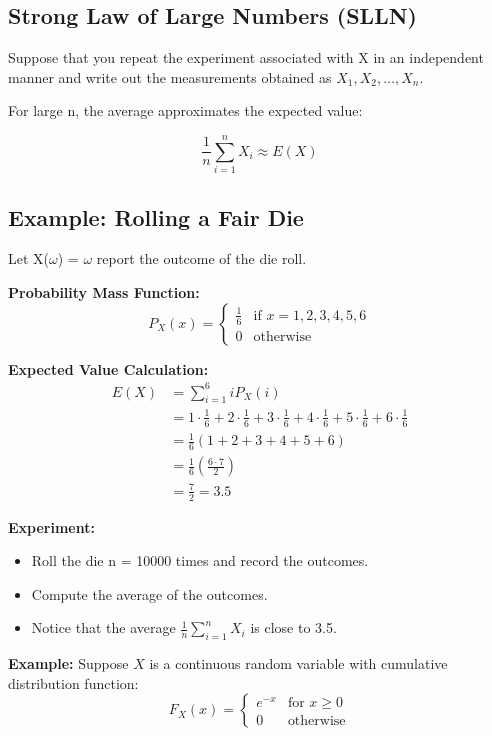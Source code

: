 \documentclass{article}
\begin{document}
    \subsection*{Strong Law of Large Numbers (SLLN)}
    
    Suppose that you repeat the experiment associated with X in an independent manner and write out
    the measurements obtained as $X_1, X_2, \ldots, X_n$.
    
    For large n, the average approximates the expected value:
    
    \[
    \frac{1}{n}\sum_{i=1}^{n} X_i \approx E(X)
    \]

    \subsection*{Example: Rolling a Fair Die}

    Let X($\omega$) = $\omega$ report the outcome of the die roll.

    \textbf{Probability Mass Function:}
    \[
    P_X(x) = 
    \begin{cases}
        \frac{1}{6} & \text{if } x = 1, 2, 3, 4, 5, 6 \\
        0 & \text{otherwise}
    \end{cases}
    \]

    \textbf{Expected Value Calculation:}
    \begin{align*}
        E(X) &= \sum_{i=1}^{6} i P_X(i) \\
             &= 1 \cdot \frac{1}{6} + 2 \cdot \frac{1}{6} + 3 \cdot \frac{1}{6} + 4 \cdot \frac{1}{6} + 5 \cdot \frac{1}{6} + 6 \cdot \frac{1}{6} \\
             &= \frac{1}{6}(1 + 2 + 3 + 4 + 5 + 6) \\
             &= \frac{1}{6}(\frac{6 \cdot 7}{2}) \\
             &= \frac{7}{2} = 3.5
    \end{align*}

    \textbf{Experiment:}
    \begin{itemize}
        \item Roll the die n = 10000 times and record the outcomes.
        \item Compute the average of the outcomes.
        \item Notice that the average $\frac{1}{n}\sum_{i=1}^{n} X_i$ is close to 3.5.
    \end{itemize}

    \textbf{Example:} Suppose $X$ is a continuous random variable with cumulative distribution function:
    \[
    F_X(x) = 
    \begin{cases}
        e^{-x} & \text{for } x \geq 0 \\
        0 & \text{otherwise}
    \end{cases}
    \]
\end{document}
